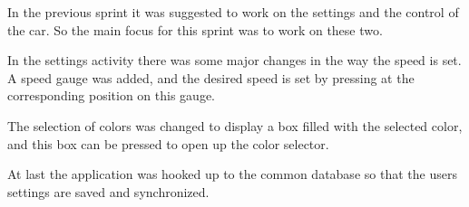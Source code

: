 In the previous sprint it was suggested to work on the settings and the control of the car.
So the main focus for this sprint was to work on these two.

In the settings activity there was some major changes in the way the speed is set.
A speed gauge was added, and the desired speed is set by pressing at the corresponding position on this gauge.

The selection of colors was changed to display a box filled with the selected color, and this box can be pressed to open up the color selector.


At last the application was hooked up to the common database so that the users settings are saved and synchronized.